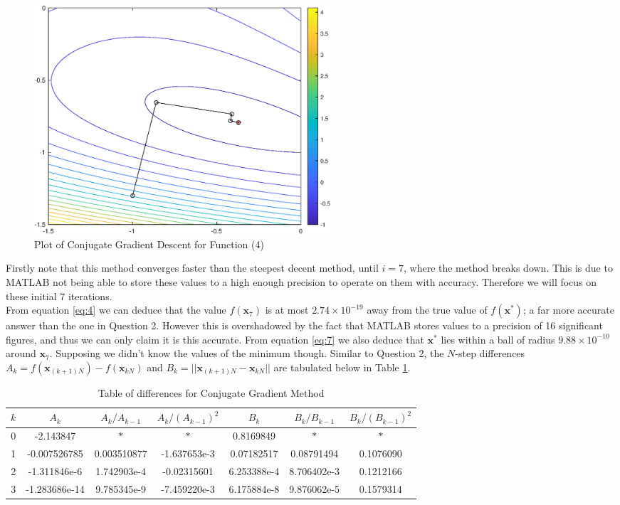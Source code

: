 \documentclass[10pt,a4paper,notitlepage]{article}
\newcommand{\abs}[1]{\lvert#1\rvert}
\newcommand{\x}{\mathbf{x}}
\begin{document}
\begin{figure}[H]
\centering
\includegraphics[width=11cm]{Image_5}
\caption{Plot of Conjugate Gradient Descent for Function (4)}\label{fg:5}
\end{figure}
Firstly note that this method converges faster than the steepest decent method, until $i=7$, where the method breaks down. This is due to MATLAB not being able to store these values to a high enough precision to operate on them with accuracy. Therefore we will focus on these initial 7 iterations. \\

From equation \eqref{eq:4} we can deduce that the value $f(\x_{7})$ is at most $2.74\times 10^{-19}$ away from the true value of $f(\x^{*})$; a far more accurate answer than the one in Question 2. However this is overshadowed by the fact that MATLAB stores values to a precision of 16 significant figures, and thus we can only claim it is this accurate. From equation \eqref{eq:7} we also deduce that $\x^{*}$ lies within a ball of radius $9.88\times 10^{-10}$ around $\x_{7}$. Supposing we didn't know the values of the minimum though. Similar to Question 2, the $N$-step differences $A_{k}=f(\x_{(k+1)N})-f(\x_{kN})$ and $B_{k}=\abs{\abs{\x_{(k+1)N}-\x_{kN}}}$ are tabulated below in Table \ref{tb:2.5}.

\begin{table}[H]
\centering
\begin{tabular}{|c|ccc|ccc|} \hline $k$ & $A_{k}$ & $A_{k}/A_{k-1}$ & $A_{k}/\left(A_{k-1}\right)^{2}$ & $B_{k}$ & $B_{k}/B_{k-1}$ & $B_{k}/\left(B_{k-1}\right)^{2}$ \\ \hline
0 & -2.143847 & $\ast$ & $\ast$ & 0.8169849 & $\ast$ & $\ast$\\ 
1 & -0.007526785 & 0.003510877 & -1.637653e-3 & 0.07182517 & 0.08791494 & 0.1076090\\ 
2 & -1.311846e-6 & 1.742903e-4 & -0.02315601 & 6.253388e-4 & 8.706402e-3 & 0.1212166\\ 
3 & -1.283686e-14 & 9.785345e-9 & -7.459220e-3 & 6.175884e-8 & 9.876062e-5 & 0.1579314 \\ \hline
\end{tabular}
\caption{Table of differences for Conjugate Gradient Method}\label{tb:2.5}
\end{table}
\end{document}
